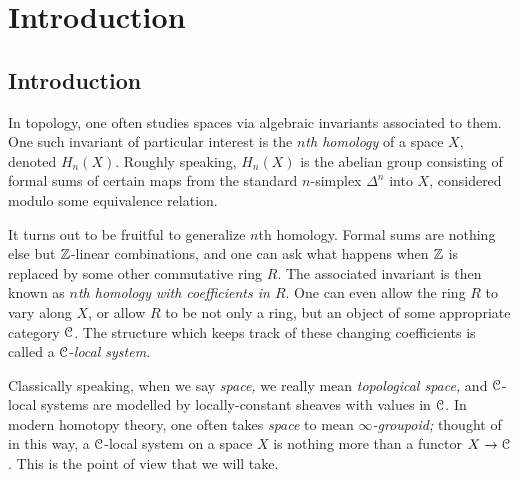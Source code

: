 \documentclass[main.tex]{subfiles}
\begin{document}
\section{Introduction}
\label{sec:introduction}

\subsection{Introduction}
\label{ssc:introduction}

In topology, one often studies spaces via algebraic invariants associated to them. One such invariant of particular interest is the \emph{$n$th homology} of a space $X$, denoted $H_{n}(X)$. Roughly speaking, $H_{n}(X)$ is the abelian group consisting of formal sums of certain maps from the standard $n$-simplex $\Delta^{n}$ into $X$, considered modulo some equivalence relation.

It turns out to be fruitful to generalize $n$th homology. Formal sums are nothing else but $\mathbb{Z}$-linear combinations, and one can ask what happens when $\mathbb{Z}$ is replaced by some other commutative ring $R$. The associated invariant is then known as \emph{$n$th homology with coefficients in $R$}. One can even allow the ring $R$ to vary along $X$, or allow $R$ to be not only a ring, but an object of some appropriate category $\mathcal{C}$. The structure which keeps track of these changing coefficients is called a $\mathcal{C}$-\emph{local system}. 

Classically speaking, when we say \emph{space,} we really mean \emph{topological space,} and $\mathcal{C}$-local systems are modelled by locally-constant sheaves with values in $\mathcal{C}$. In modern homotopy theory, one often takes \emph{space} to mean \emph{$\infty$-groupoid;} thought of in this way, a $\mathcal{C}$-local system on a space $X$ is nothing more than a functor $X \to \mathcal{C}$. This is the point of view that we will take.
\end{document}

